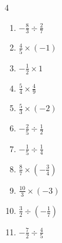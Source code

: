 \begin{multicols}{4}
\begin{enumerate}

  \item $\displaystyle -\frac{8}{3}\div{}\frac{2}{7}$


  \item $\displaystyle \frac{4}{5}\times{}\left(-1\right)$


\columnbreak %

  \item $\displaystyle -\frac{1}{2}\times{}1$


  \item $\displaystyle \frac{5}{4}\times{}\frac{4}{9}$


  \item $\displaystyle \frac{5}{3}\times{}\left(-2\right)$


  \item $\displaystyle -\frac{2}{5}\div{}\frac{1}{2}$


  \item $\displaystyle -\frac{1}{5}\div{}\frac{1}{4}$


  \item $\displaystyle \frac{8}{7}\times{}\left(-\frac{3}{4}\right)$


  \item $\displaystyle \frac{10}{3}\times{}\left(-3\right)$

        \phantom{$\displaystyle =-10$}

  \item $\displaystyle \frac{3}{2}\div{}\left(-\frac{1}{7}\right)$


  \item $\displaystyle -\frac{7}{2}\div{}\frac{4}{5}$



\end{enumerate}
\end{multicols}
